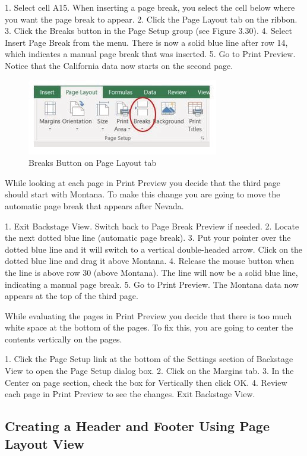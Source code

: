 1. Select cell A15. When inserting a page break, you select the cell below where you want the page
break to appear.
2. Click the Page Layout tab on the ribbon.
3. Click the Breaks button in the Page Setup group (see Figure 3.30).
4. Select Insert Page Break from the menu. There is now a solid blue line after row 14, which
indicates a manual page break that was inserted.
5. Go to Print Preview. Notice that the California data now starts on the second page.


\begin{figure}[H]
	\centering
	\includegraphics[width=\maxwidth{.95\linewidth}]{gfx/ch03_fig31}
	\caption{Breaks Button on Page Layout tab}
	\label{03:fig31}
\end{figure}


While looking at each page in Print Preview you decide that the third page should start with Montana.
To make this change you are going to move the automatic page break that appears after Nevada.

1. Exit Backstage View. Switch back to Page Break Preview if needed.
2. Locate the next dotted blue line (automatic page break).
3. Put your pointer over the dotted blue line and it will switch to a vertical double-headed arrow.
Click on the dotted blue line and drag it above Montana.
4. Release the mouse button when the line is above row 30 (above Montana). The line will now be a
solid blue line, indicating a manual page break.
5. Go to Print Preview. The Montana data now appears at the top of the third page.

While evaluating the pages in Print Preview you decide that there is too much white space at the
bottom of the pages. To fix this, you are going to center the contents vertically on the pages.

1. Click the Page Setup link at the bottom of the Settings section of Backstage View to open the
Page Setup dialog box.
2. Click on the Margins tab.
3. In the Center on page section, check the box for Vertically then click OK.
4. Review each page in Print Preview to see the changes. Exit Backstage View.

\subsection{Creating a Header and Footer Using Page Layout View}

